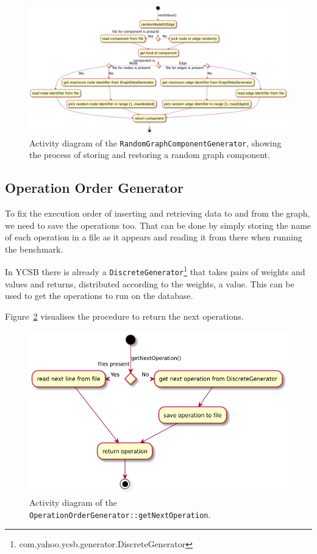 \begin{figure}
  \includegraphics[width=\textwidth]{images/extensions/randomGraphComponentGenerator}
  \caption{Activity diagram of the \texttt{RandomGraphComponentGenerator}, showing the process of storing and restoring a random graph component.}
  \label{fig:randomGraphComponentGenerator}
\end{figure}

\subsection{Operation Order Generator}
\label{ch:design:se:operationOrderGenerator}
To fix the execution order of inserting and retrieving data to and from the graph,
we need to save the operations too.
That can be done by simply storing the name of each operation in a file as it appears and reading it from there when running the benchmark.

In YCSB there is already a \texttt{DiscreteGenerator}\footnote{com.yahoo.ycsb.generator.DiscreteGenerator} that takes pairs of weights and values and returns,
distributed according to the weights,
a value.
This can be used to get the operations to run on the database.

Figure~\ref{fig:operationOrderGenerator} visualises the procedure to return the next operations.

\begin{figure}
  \includegraphics[width=\textwidth]{images/extensions/OperationOrderGenerator}
  \caption{Activity diagram of the \texttt{OperationOrderGenerator::getNextOperation}.}
  \label{fig:operationOrderGenerator}
\end{figure}

